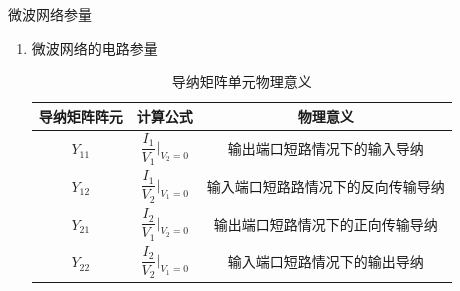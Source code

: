 \begin{frame}{微波网络参量}
    \begin{enumerate}
        \item 微波网络的电路参量
        \begin{table}
            \caption{导纳矩阵单元物理意义}
            \footnotesize
            \begin{tabular}{|c|c|c|}
                \hline
                \textbf{导纳矩阵阵元}   & \textbf{计算公式}                            & \textbf{物理意义}             \\ \hline
                $Y_{11}$ & $\dfrac{I_1}{V_1}\bigg\vert_{V_2=0}$ & 输出端口短路情况下的输入导纳   \\ \hline
                $Y_{12}$ & $\dfrac{I_1}{V_2}\bigg\vert_{V_1=0}$ & 输入端口短路路情况下的反向传输导纳 \\ \hline
                $Y_{21}$ & $\dfrac{I_2}{V_1}\bigg\vert_{V_2=0}$ & 输出端口短路情况下的正向传输导纳 \\ \hline
                $Y_{22}$ & $\dfrac{I_2}{V_2}\bigg\vert_{V_1=0}$ & 输入端口短路情况下的输出导纳   \\ \hline
            \end{tabular}
        \end{table}
    \end{enumerate}
\end{frame}

